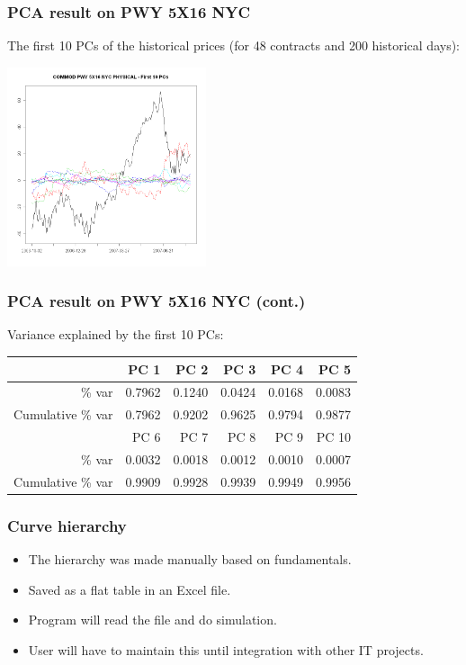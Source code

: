 \documentclass[10pt]{beamer}
\begin{document}
\frame
{
  \frametitle{PCA result on PWY 5X16 NYC}
The first 10 PCs of the historical prices 
(for 48 contracts and 200 historical days):
\begin{center}
  \includegraphics[height=2.3in]{figures/pc-pwy-peak.png}
\end{center}
}

\frame
{
  \frametitle{PCA result on PWY 5X16 NYC (cont.)}
Variance explained by the first 10 PCs:
\begin{table}[ht]
\begin{center}
\begin{tabular}{rrrrrr}
  \hline
 & PC 1 & PC 2 & PC 3 & PC 4 & PC 5 \\
  \hline
\% var  & 0.7962 & 0.1240 & 0.0424 & 0.0168 & 0.0083 \\
Cumulative \% var & 0.7962 & 0.9202 & 0.9625 & 0.9794 & 0.9877 \\
\hline \hline
 & PC 6 & PC 7 & PC 8 & PC 9 & PC 10 \\
\hline
\% var  & 0.0032 & 0.0018 & 0.0012 & 0.0010 & 0.0007 \\
 Cumulative \% var & 0.9909 & 0.9928 & 0.9939 & 0.9949 & 0.9956 \\
   \hline
\end{tabular}
\end{center}
\end{table}
}

\frame
{
  \frametitle{Curve hierarchy}
\begin{itemize}
\item The hierarchy was made manually based on fundamentals.
\item Saved as a flat table in an Excel file. 
\item Program will read the file and do simulation.
\item User will have to maintain this until integration with other
IT projects.
\end{itemize}
}
\end{document}
